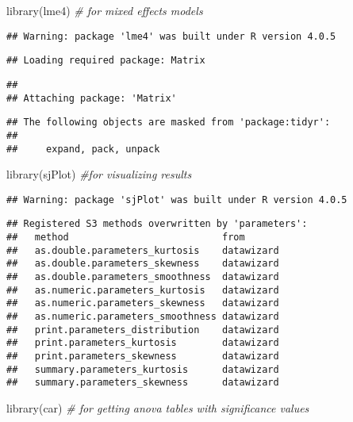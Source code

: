 \documentclass[
]{article}
\newenvironment{Shaded}{\begin{snugshade}}{\end{snugshade}}
\newcommand{\CommentTok}[1]{\textcolor[rgb]{0.56,0.35,0.01}{\textit{#1}}}
\newcommand{\FunctionTok}[1]{\textcolor[rgb]{0.00,0.00,0.00}{#1}}
\newcommand{\NormalTok}[1]{#1}
\begin{document}
\begin{Shaded}
\begin{Highlighting}[]
\FunctionTok{library}\NormalTok{(lme4) }\CommentTok{\# for mixed effects models}
\end{Highlighting}
\end{Shaded}

\begin{verbatim}
## Warning: package 'lme4' was built under R version 4.0.5
\end{verbatim}

\begin{verbatim}
## Loading required package: Matrix
\end{verbatim}

\begin{verbatim}
## 
## Attaching package: 'Matrix'
\end{verbatim}

\begin{verbatim}
## The following objects are masked from 'package:tidyr':
## 
##     expand, pack, unpack
\end{verbatim}

\begin{Shaded}
\begin{Highlighting}[]
\FunctionTok{library}\NormalTok{(sjPlot) }\CommentTok{\#for visualizing results}
\end{Highlighting}
\end{Shaded}

\begin{verbatim}
## Warning: package 'sjPlot' was built under R version 4.0.5
\end{verbatim}

\begin{verbatim}
## Registered S3 methods overwritten by 'parameters':
##   method                           from      
##   as.double.parameters_kurtosis    datawizard
##   as.double.parameters_skewness    datawizard
##   as.double.parameters_smoothness  datawizard
##   as.numeric.parameters_kurtosis   datawizard
##   as.numeric.parameters_skewness   datawizard
##   as.numeric.parameters_smoothness datawizard
##   print.parameters_distribution    datawizard
##   print.parameters_kurtosis        datawizard
##   print.parameters_skewness        datawizard
##   summary.parameters_kurtosis      datawizard
##   summary.parameters_skewness      datawizard
\end{verbatim}

\begin{Shaded}
\begin{Highlighting}[]
\FunctionTok{library}\NormalTok{(car) }\CommentTok{\# for getting anova tables with significance values}
\end{Highlighting}
\end{Shaded}
\end{document}
